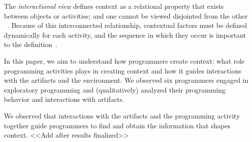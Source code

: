 The \textit{interactional view} defines context as a relational property that exists between objects or activities; and one cannot be viewed disjointed from the other ~\cite{Dourish:2004}. Because of this interconnected relationship, contextual factors must be defined dynamically for each activity, and the sequence in which they occur is important to the definition~\cite{Viriyakattiyaporn:2010}.

In this paper, we aim to understand how programmers create context: what role programming activities plays in creating context and how it guides interactions with the artifacts and the environment. We observed six programmers engaged in exploratory programming and (qualitatively) analyzed their programming behavior and interactions with artifacts.


We observed that interactions with the artifacts and the programming activity together guide programmers to find and obtain the information that shapes context. <<Add after results finalized>>

